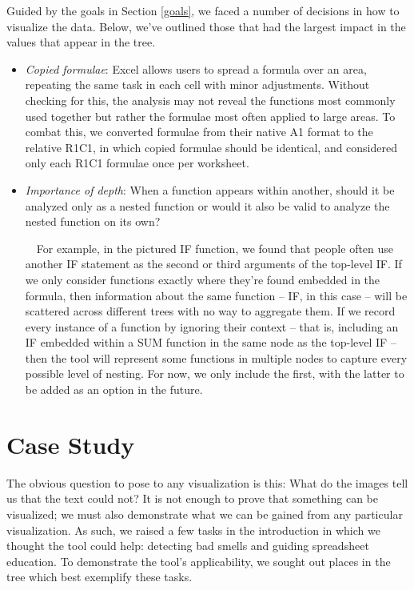\documentclass[conference]{IEEEtran}
\begin{document}
	Guided by the goals in Section \ref{goals}, we faced a number of decisions in
	how to visualize the data. Below, we've outlined those that
	had the largest impact in the values that appear in the tree. \begin{itemize}
		
		\item \textit{Copied formulae}: Excel allows users to spread a formula over an
		area, repeating the same task in each cell with minor adjustments. Without
		checking for this, the analysis may not reveal the functions most commonly
		used together but rather the formulae most often applied to large areas. To
		combat this, we converted formulae from their native A1 format to the relative
		R1C1, in which copied formulae should be identical, and considered only each
		R1C1 formulae once per worksheet.
		
		\item \textit{Importance of depth}: When a function appears within another,
		should it be analyzed only as a nested function or would it also be valid to
		analyze the nested function on its own? \par
		
		\ \ For example, in the pictured IF function, we found that people often use
		another IF statement as the second or third arguments of the top-level IF. If
		we only consider functions exactly where they're found embedded in the
		formula, then information about the same function -- IF, in this case -- will
		be scattered across different trees with no way to aggregate them. If we
		record every instance of a function by ignoring their context -- that is,
		including an IF embedded within a SUM function in the same node as the
		top-level IF -- then the tool will represent some functions in multiple nodes
		to capture every possible level of nesting. For now, we only include the
		first, with the latter to be added as an option in the future.
		
	\end{itemize}
	
	\section{Case Study} The obvious question to pose to any visualization is this:
	What do the images tell us that the text could not? It is not enough to prove
	that something can be visualized; we must also demonstrate what we can be
	gained from any particular visualization. As such, we raised a few tasks in the
	introduction in which we thought the tool could help: detecting bad smells and
	guiding spreadsheet education. To demonstrate the tool's applicability, we
	sought out places in the tree which best exemplify these tasks.
	
\end{document}
